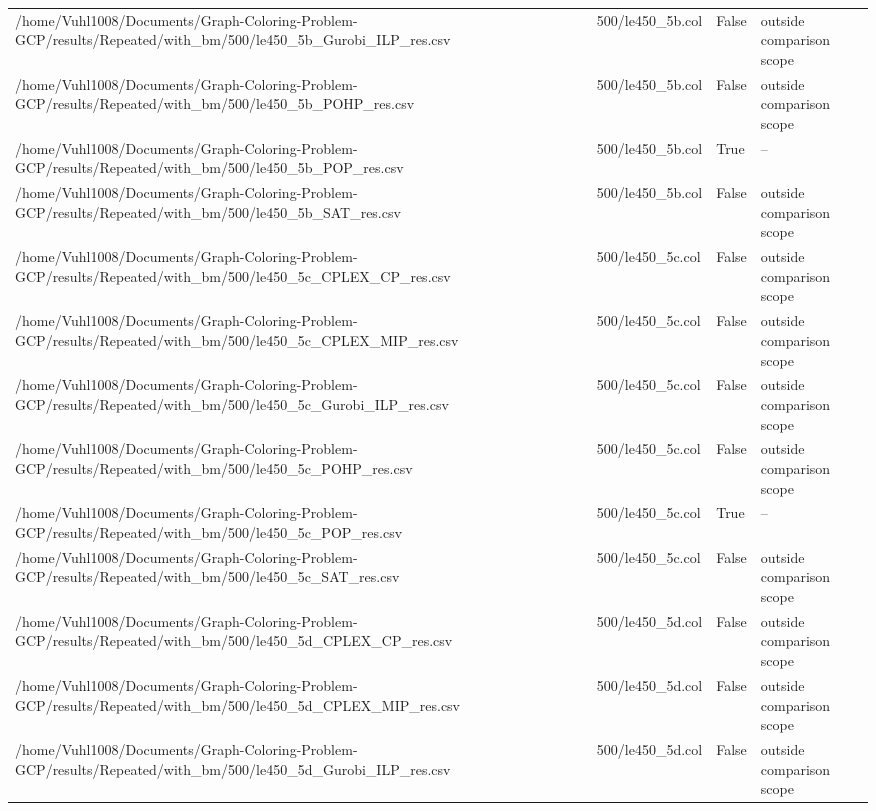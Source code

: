\begin{table}[htbp]
\begin{tabular}{llll}
/home/Vuhl1008/Documents/Graph-Coloring-Problem-GCP/results/Repeated/with\_bm/500/le450\_5b\_Gurobi\_ILP\_res.csv & 500/le450\_5b.col & False & outside comparison scope \\
/home/Vuhl1008/Documents/Graph-Coloring-Problem-GCP/results/Repeated/with\_bm/500/le450\_5b\_POHP\_res.csv & 500/le450\_5b.col & False & outside comparison scope \\
/home/Vuhl1008/Documents/Graph-Coloring-Problem-GCP/results/Repeated/with\_bm/500/le450\_5b\_POP\_res.csv & 500/le450\_5b.col & True & -- \\
/home/Vuhl1008/Documents/Graph-Coloring-Problem-GCP/results/Repeated/with\_bm/500/le450\_5b\_SAT\_res.csv & 500/le450\_5b.col & False & outside comparison scope \\
/home/Vuhl1008/Documents/Graph-Coloring-Problem-GCP/results/Repeated/with\_bm/500/le450\_5c\_CPLEX\_CP\_res.csv & 500/le450\_5c.col & False & outside comparison scope \\
/home/Vuhl1008/Documents/Graph-Coloring-Problem-GCP/results/Repeated/with\_bm/500/le450\_5c\_CPLEX\_MIP\_res.csv & 500/le450\_5c.col & False & outside comparison scope \\
/home/Vuhl1008/Documents/Graph-Coloring-Problem-GCP/results/Repeated/with\_bm/500/le450\_5c\_Gurobi\_ILP\_res.csv & 500/le450\_5c.col & False & outside comparison scope \\
/home/Vuhl1008/Documents/Graph-Coloring-Problem-GCP/results/Repeated/with\_bm/500/le450\_5c\_POHP\_res.csv & 500/le450\_5c.col & False & outside comparison scope \\
/home/Vuhl1008/Documents/Graph-Coloring-Problem-GCP/results/Repeated/with\_bm/500/le450\_5c\_POP\_res.csv & 500/le450\_5c.col & True & -- \\
/home/Vuhl1008/Documents/Graph-Coloring-Problem-GCP/results/Repeated/with\_bm/500/le450\_5c\_SAT\_res.csv & 500/le450\_5c.col & False & outside comparison scope \\
/home/Vuhl1008/Documents/Graph-Coloring-Problem-GCP/results/Repeated/with\_bm/500/le450\_5d\_CPLEX\_CP\_res.csv & 500/le450\_5d.col & False & outside comparison scope \\
/home/Vuhl1008/Documents/Graph-Coloring-Problem-GCP/results/Repeated/with\_bm/500/le450\_5d\_CPLEX\_MIP\_res.csv & 500/le450\_5d.col & False & outside comparison scope \\
/home/Vuhl1008/Documents/Graph-Coloring-Problem-GCP/results/Repeated/with\_bm/500/le450\_5d\_Gurobi\_ILP\_res.csv & 500/le450\_5d.col & False & outside comparison scope \\

\end{tabular}
\end{table}
